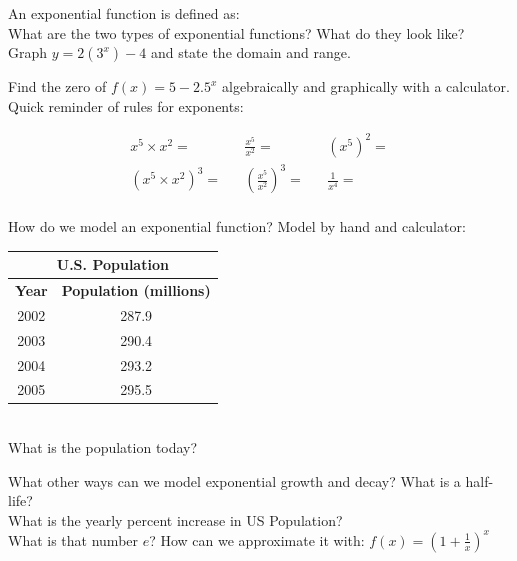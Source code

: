 \documentclass[11pt]{article}
\begin{document}
    \noindent An exponential function is defined as:\\[2ex]

    \noindent What are the two types of exponential functions? What do they look like?\\[2ex]

    \noindent Graph $\displaystyle y=2(3^x)-4$ and state the domain and range.

    \emptygraph

    \noindent Find the zero of $\displaystyle f(x)=5-2.5^x$ algebraically and graphically with a calculator.\\[2ex]

    \noindent Quick reminder of rules for exponents:

    \begin{align*}
        x^5 \times x^2 =     &  & \frac{x^5}{x^2} =                &  & (x^5)^2 =       \\[10ex]
        (x^5 \times x^2)^3 = &  & \left(\frac{x^5}{x^2}\right)^3 = &  & \frac{1}{x^4} =
    \end{align*}\\[2ex]

    \noindent How do we model an exponential function? Model by hand and calculator:\\[1ex]

    \begin{tabular}{|c|c|}
        \hline
        \multicolumn{2}{|c|}{\textbf{U.S. Population}} \\ \hline
        \textbf{Year} & \textbf{Population (millions)} \\ \hline
        2002          & 287.9                          \\ \hline
        2003          & 290.4                          \\ \hline
        2004          & 293.2                          \\ \hline
        2005          & 295.5                          \\ \hline
    \end{tabular}\\[2ex]

    \noindent What is the population today?\\[2ex]

    \newpage

    \noindent What other ways can we model exponential growth and decay? What is a half-life?\\[2ex]

    \noindent What is the yearly percent increase in US Population?\\[2ex]

    \noindent What is that number $\displaystyle e$? How can we approximate it with: $\displaystyle f(x)=\left(1+\frac{1}{x}\right)^x$
\end{document}
